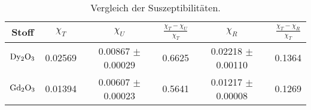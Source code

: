 \begin{table}
  \centering
  \caption{Vergleich der Suszeptibilitäten.}
  \label{tab:vergleich}
  \begin{tabular}{c c c c c c}
    \toprule
    {Stoff} & {$\chi_T$} &{$\chi_U$} & {$\frac{\chi_T - \chi_U}{\chi_T}$} & {$\chi_R$} & {$\frac{\chi_T - \chi_R}{\chi_T}$}\\
    \midrule
    $\ce{Dy2O3}$ & 0.02569 & 0.00867 $\pm$ 0.00029 & 0.6625 & 0.02218 $\pm$ 0.00110 & 0.1364 \\
    $\ce{Gd2O3}$ & 0.01394 & 0.00607 $\pm$ 0.00023 & 0.5641 & 0.01217 $\pm$ 0.00008 & 0.1269 \\
    \bottomrule
  \end{tabular}
\end{table}